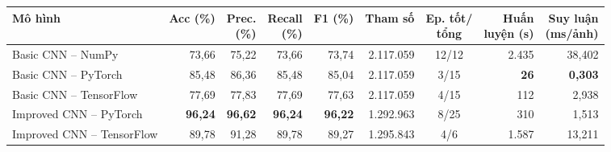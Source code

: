 \begin{tabular}{lrrrrrcrr}
\toprule
Mô hình & Acc (\%) & \makecell[r]{Prec.\\(\%)} & \makecell[r]{Recall\\(\%)} & F1 (\%) & Tham số & \makecell[c]{Ep. tốt/\\tổng} & \makecell[r]{Huấn\\luyện (s)} & \makecell[r]{Suy luận\\(ms/ảnh)} \\
\midrule
Basic CNN – NumPy & 73{,}66 & 75{,}22 & 73{,}66 & 73{,}74 & 2{.}117{.}059 & 12/12 & 2{.}435 & 38{,}402 \\
Basic CNN – PyTorch & 85{,}48 & 86{,}36 & 85{,}48 & 85{,}04 & 2{.}117{.}059 & 3/15 & \textbf{26} & \textbf{0{,}303} \\
Basic CNN – TensorFlow & 77{,}69 & 77{,}83 & 77{,}69 & 77{,}63 & 2{.}117{.}059 & 4/15 & 112 & 2{,}938 \\
Improved CNN – PyTorch & \textbf{96{,}24} & \textbf{96{,}62} & \textbf{96{,}24} & \textbf{96{,}22} & 1{.}292{.}963 & 8/25 & 310 & 1{,}513 \\
Improved CNN – TensorFlow & 89{,}78 & 91{,}28 & 89{,}78 & 89{,}27 & 1{.}295{.}843 & 4/6 & 1{.}587 & 13{,}211 \\
\bottomrule
\end{tabular}

